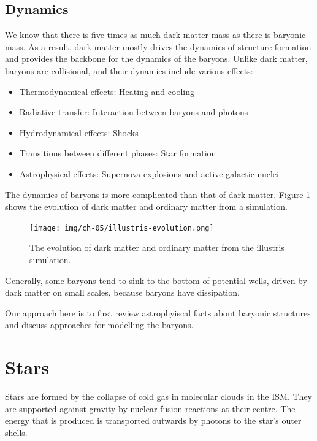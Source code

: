 \subsection{Dynamics}
We know that there is five times as much dark matter mass as there is baryonic mass.
As a result, dark matter mostly drives the dynamics of structure formation and provides the backbone for the dynamics of the baryons.
Unlike dark matter, baryons are collisional, and their dynamics include various effects:
\begin{itemize}
	\item Thermodynamical effects: Heating and cooling
	\item Radiative transfer: Interaction between baryons and photons
	\item Hydrodynamical effects: Shocks
	\item Transitions between different phases: Star formation
	\item Astrophysical effects: Supernova explosions and active galactic nuclei
\end{itemize}
The dynamics of baryons is more complicated than that of dark matter.
Figure \ref{fig:illustris-evolution} shows the evolution of dark matter and ordinary matter from a simulation.

\begin{figure}
	\texttt{[image: img/ch-05/illustris-evolution.png]}
	\caption{The evolution of dark matter and ordinary matter from the illustris simulation.}
	\label{fig:illustris-evolution}
\end{figure}

Generally, some baryons tend to sink to the bottom of potential wells, driven by dark matter on small scales, because baryons have dissipation.

Our approach here is to first review astrophyiscal facts about baryonic structures and discuss approaches for modelling the baryons.





\section{Stars}

Stars are formed by the collapse of cold gas in molecular clouds in the ISM.
They are supported against gravity by nuclear fusion reactions at their centre.
The energy that is produced is transported outwards by photons to the star's outer shells.

